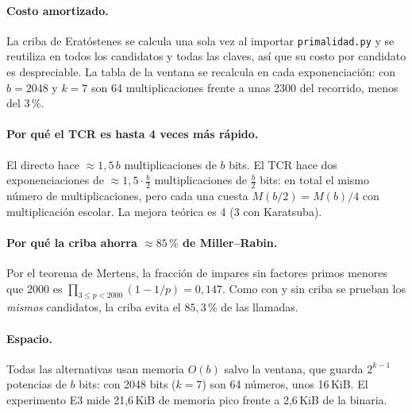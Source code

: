 \paragraph{Costo amortizado.} La criba de Eratóstenes se calcula una sola vez al
importar \texttt{primalidad.py} y se reutiliza en todos los candidatos y todas
las claves, así que su costo por candidato es despreciable. La tabla de la
ventana se recalcula en cada exponenciación: con $b = 2048$ y $k = 7$ son 64
multiplicaciones frente a unas 2300 del recorrido, menos del 3\,\%.

\paragraph{Por qué el TCR es hasta 4 veces más rápido.} El directo hace
$\approx 1{,}5\,b$ multiplicaciones de $b$ bits. El TCR hace dos exponenciaciones
de $\approx 1{,}5\cdot\frac b2$ multiplicaciones de $\frac b2$ bits: en total el
mismo número de multiplicaciones, pero cada una cuesta $M(b/2) = M(b)/4$ con
multiplicación escolar. La mejora teórica es 4 (3 con Karatsuba).

\paragraph{Por qué la criba ahorra $\approx 85\,\%$ de Miller--Rabin.} Por el
teorema de Mertens, la fracción de impares sin factores primos menores que 2000
es $\prod_{3 \le p < 2000}(1 - 1/p) = 0{,}147$. Como con y sin criba se prueban
los \emph{mismos} candidatos, la criba evita el $85{,}3\,\%$ de las llamadas.

\paragraph{Espacio.} Todas las alternativas usan memoria $O(b)$ salvo la ventana,
que guarda $2^{k-1}$ potencias de $b$ bits: con 2048 bits ($k = 7$) son 64
números, unos 16\,KiB. El experimento E3 mide 21,6\,KiB de memoria pico frente a
2,6\,KiB de la binaria.

